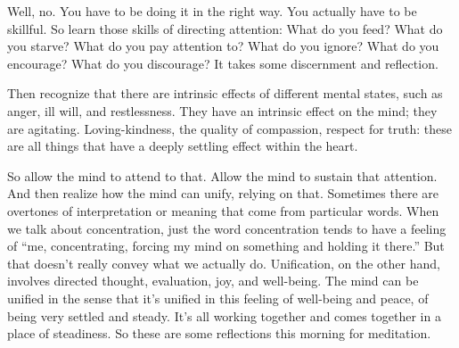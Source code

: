 Well, no. You have to be doing it in the right way. You actually have to
be skillful. So learn those skills of directing attention: What do you
feed? What do you starve? What do you pay attention to? What do you
ignore? What do you encourage? What do you discourage? It takes some
discernment and reflection.

Then recognize that there are intrinsic effects of different mental
states, such as anger, ill will, and restlessness. They have an
intrinsic effect on the mind; they are agitating. Loving-kindness, the
quality of compassion, respect for truth: these are all things that have
a deeply settling effect within the heart.

So allow the mind to attend to that. Allow the mind to sustain that
attention. And then realize how the mind can unify, relying on that.
Sometimes there are overtones of interpretation or meaning that come
from particular words. When we talk about concentration, just the word
concentration tends to have a feeling of “me, concentrating, forcing my
mind on something and holding it there.” But that doesn’t really convey
what we actually do. Unification, on the other hand, involves directed
thought, evaluation, joy, and well-being. The mind can be unified in the
sense that it’s unified in this feeling of well-being and peace, of
being very settled and steady. It’s all working together and comes
together in a place of steadiness. So these are some reflections this
morning for meditation.
